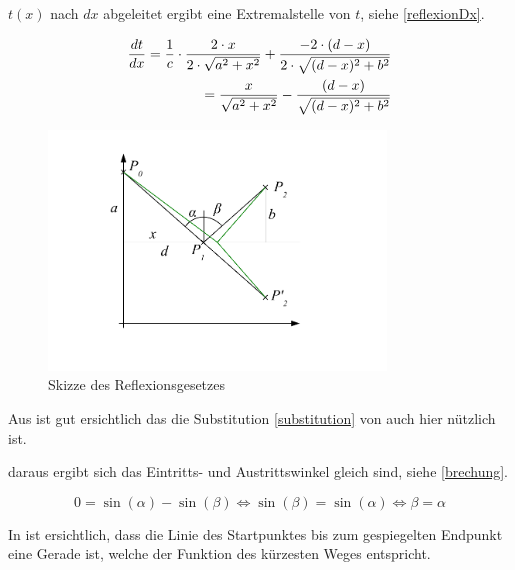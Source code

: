 $t(x)$ nach $dx$ abgeleitet ergibt eine Extremalstelle  von $t$, siehe \eqref{reflexionDx}.

\begin{align}
\frac{dt}{dx} = \frac{1}{c} \cdot \frac{2 \cdot x}{2 \cdot \sqrt{a^2 + x^2}} + \frac{-2 \cdot (d-x)}{2 \cdot \sqrt{(d-x)^2 + b^2}} \notag \\
= \frac{x}{ \sqrt{a^2 + x^2}} - \frac{(d-x)}{ \sqrt{(d-x)^2 + b^2}} \label{reflexionDx}
\end{align}

\begin{figure}[H]
	\includegraphics[width=0.8\textwidth]{./picture/Spiegelung.pdf}
	\caption{Skizze des Reflexionsgesetzes}
	\label{Ab:spiegelung}
\end{figure}

Aus  ist gut ersichtlich das die Substitution \ref{substitution}  von  auch hier nützlich ist.


daraus ergibt sich das Eintritts- und Austrittswinkel gleich sind, siehe \eqref{brechung}.


\begin{equation}
0 = \sin(\alpha) - \sin(\beta) \Leftrightarrow \sin(\beta) = \sin(\alpha) \Leftrightarrow\beta = \alpha
\end{equation}

In  ist ersichtlich, dass die Linie des Startpunktes bis zum 
gespiegelten Endpunkt eine Gerade ist, welche der Funktion des kürzesten Weges entspricht.


